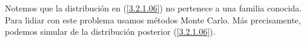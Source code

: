 Notemos que la distribución en (\ref{3.2.1.06}) no pertenece a una familia conocida. Para lidiar con este problema usamos métodos Monte Carlo. Más precisamente, podemos simular de la distribución posterior (\ref{3.2.1.06}).





